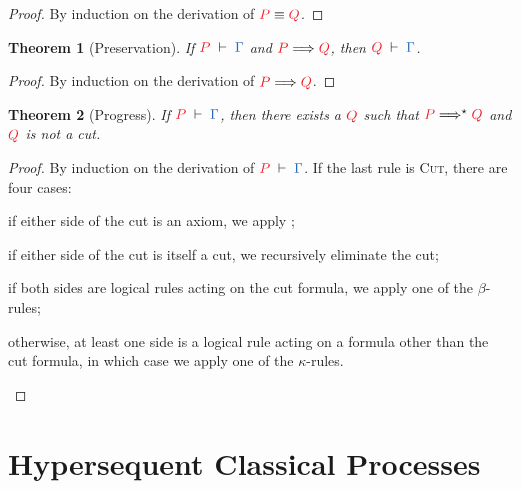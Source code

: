 \documentclass[draft,submission,copyright,creativecommons]{eptcs}
\newtheorem{theorem}{Theorem}
\begin{document}
\begin{proof}
  By induction on the derivation of $\tm{P}\equiv\tm{Q}$.
\end{proof}
\begin{theorem}[Preservation]\label{thm:cp-preservation}
  If $\seq[P]{\Gamma}$ and $\reducesto{P}{Q}$, then $\seq[Q]{\Gamma}$.
\end{theorem}
\begin{proof}
  By induction on the derivation of $\reducesto{P}{Q}$.
\end{proof}
\begin{theorem}[Progress]\label{thm:cp-progress}
  If $\seq[P]{\Gamma}$, then there exists a $\tm{Q}$ such that
  $\tm{P}\Longrightarrow^\star\tm{Q}$ and $\tm{Q}$ is not a cut.
\end{theorem}
\begin{proof}
  By induction on the derivation of $\seq[P]{\Gamma}$.
  If the last rule is \textsc{Cut}, there are four cases:
  \begin{enumerate*}[label={\alph*)}]
  \item
    if either side of the cut is an axiom, we apply ;
  \item
    if either side of the cut is itself a cut, we recursively eliminate the cut;
  \item
    if both sides are logical rules acting on the cut formula, we apply
    one of the $\beta$-rules;
  \item
    otherwise, at least one side is a logical rule acting on a formula other
    than the cut formula, in which case we apply one of the $\kappa$-rules.
  \end{enumerate*}
\end{proof}


\section{Hypersequent Classical Processes}
\label{sec:hcp}
\end{document}
